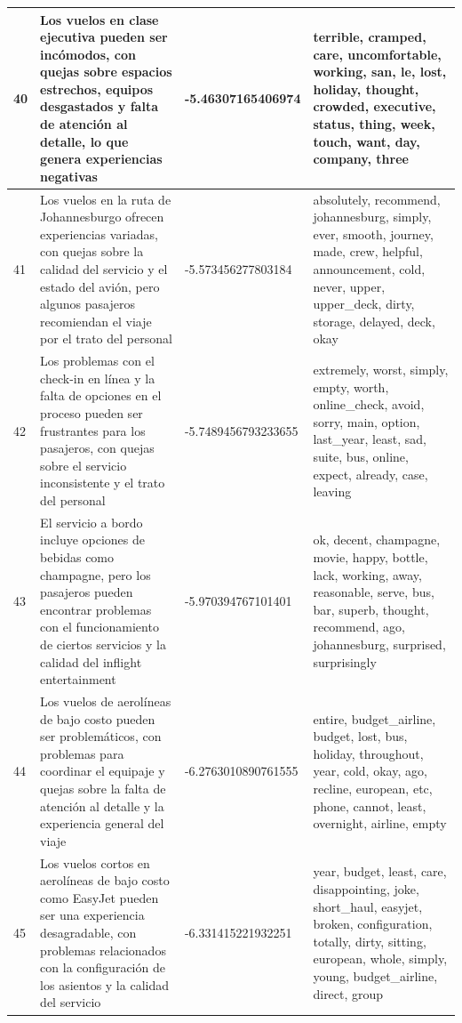 \documentclass{report}
\begin{document}
{\begin{longtable}{|p{1cm}|p{4cm}|p{4cm}|p{6cm}|}
                    \hline
                    40 & Los vuelos en clase ejecutiva pueden ser incómodos, con quejas sobre espacios estrechos, equipos desgastados y falta de atención al detalle, lo que genera experiencias negativas & -5.46307165406974 & terrible, cramped, care, uncomfortable, working, san, le, lost, holiday, thought, crowded, executive, status, thing, week, touch, want, day, company, three \\
                    \hline
                    41 & Los vuelos en la ruta de Johannesburgo ofrecen experiencias variadas, con quejas sobre la calidad del servicio y el estado del avión, pero algunos pasajeros recomiendan el viaje por el trato del personal & -5.573456277803184 & absolutely, recommend, johannesburg, simply, ever, smooth, journey, made, crew, helpful, announcement, cold, never, upper, upper\_deck, dirty, storage, delayed, deck, okay \\
                    \hline
                    42 & Los problemas con el check-in en línea y la falta de opciones en el proceso pueden ser frustrantes para los pasajeros, con quejas sobre el servicio inconsistente y el trato del personal & -5.7489456793233655 & extremely, worst, simply, empty, worth, online\_check, avoid, sorry, main, option, last\_year, least, sad, suite, bus, online, expect, already, case, leaving \\
                    \hline
                    43 & El servicio a bordo incluye opciones de bebidas como champagne, pero los pasajeros pueden encontrar problemas con el funcionamiento de ciertos servicios y la calidad del inflight entertainment & -5.970394767101401 & ok, decent, champagne, movie, happy, bottle, lack, working, away, reasonable, serve, bus, bar, superb, thought, recommend, ago, johannesburg, surprised, surprisingly \\
                    \hline
                    44 & Los vuelos de aerolíneas de bajo costo pueden ser problemáticos, con problemas para coordinar el equipaje y quejas sobre la falta de atención al detalle y la experiencia general del viaje & -6.2763010890761555 & entire, budget\_airline, budget, lost, bus, holiday, throughout, year, cold, okay, ago, recline, european, etc, phone, cannot, least, overnight, airline, empty \\
                    \hline
                    45 & Los vuelos cortos en aerolíneas de bajo costo como EasyJet pueden ser una experiencia desagradable, con problemas relacionados con la configuración de los asientos y la calidad del servicio & -6.331415221932251 & year, budget, least, care, disappointing, joke, short\_haul, easyjet, broken, configuration, totally, dirty, sitting, european, whole, simply, young, budget\_airline, direct, group \\

\end{longtable}}
\end{document}
